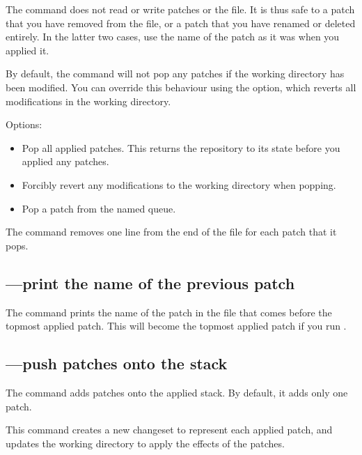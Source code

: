 The  command does not read or write patches or the
 file.  It is thus safe to  a patch that
you have removed from the  file, or a patch that you
have renamed or deleted entirely.  In the latter two cases, use the
name of the patch as it was when you applied it.

By default, the  command will not pop any patches if the
working directory has been modified.  You can override this behaviour
using the  option, which reverts all modifications in
the working directory.

Options:
\begin{itemize}
\item[\hgopt{qpop}{-a}] Pop all applied patches.  This returns the
  repository to its state before you applied any patches.
\item[\hgopt{qpop}{-f}] Forcibly revert any modifications to the
  working directory when popping.
\item[\hgopt{qpop}{-n}] Pop a patch from the named queue.
\end{itemize}

The  command removes one line from the end of the
 file for each patch that it pops.

\subsection{---print the name of the previous patch}

The  command prints the name of the patch in the
 file that comes before the topmost applied patch.
This will become the topmost applied patch if you run .

\subsection{---push patches onto the stack}
\label{sec:mq:cmd:qpush}

The  command adds patches onto the applied stack.  By
default, it adds only one patch.

This command creates a new changeset to represent each applied patch,
and updates the working directory to apply the effects of the patches.

